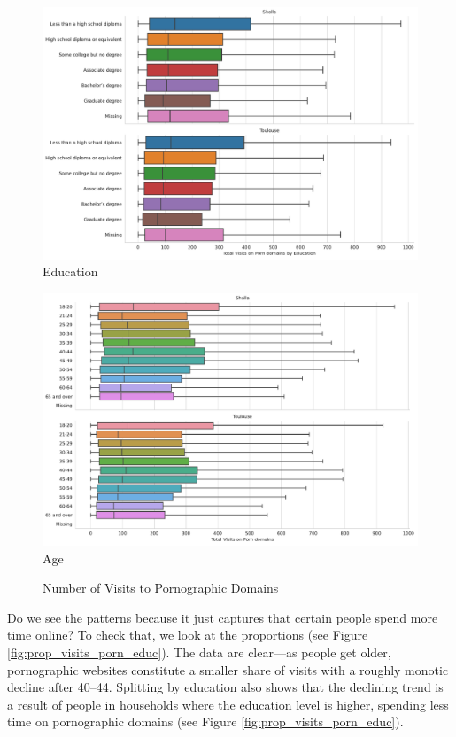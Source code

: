 \documentclass[12pt, letterpaper]{article}
\begin{document}
\begin{figure}[!htb]
\centering
\caption{Number of Visits to Pornographic Domains}\label{fig:total_visits_porn}
	\begin{minipage}[b]{0.47\textwidth}
	\centering
	\label{fig:total_visits_porn_educ}
	\includegraphics[width=\textwidth]{../figs/total_visits_porn_educ.pdf}\\Education
	\end{minipage}
	\begin{minipage}[b]{0.47\textwidth}
	\centering
	\label{fig:total_visits_porn_age}
	\includegraphics[width=\textwidth]{../figs/total_visits_porn_age.pdf}\\Age
	\end{minipage}
\end{figure}

Do we see the patterns because it just captures that certain people spend more time online? To check that, we look at the proportions (see Figure \ref{fig:prop_visits_porn_educ}). The data are clear---as people get older, pornographic websites constitute a smaller share of visits with a roughly monotic decline after 40--44. Splitting by education also shows that the declining trend is a result of people in households where the education level is higher, spending less time on pornographic domains (see Figure \ref{fig:prop_visits_porn_educ}).
\end{document}
